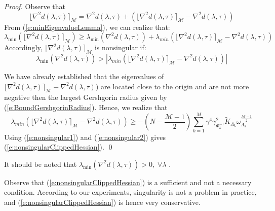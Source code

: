 \begin{proof}
Observe that
\begin{equation}
\lfloor \nabla^2 d(\lambda, \tau) \rceil_{\mathcal{M}} = \nabla^2 d(\lambda, \tau) + \left( \lfloor \nabla^2 d(\lambda, \tau) \rceil_{\mathcal{M}} - \nabla^2 d(\lambda,\tau) \right)
\end{equation}
From (\ref{e:minEigenvalueLemma}), we can realize that:
\begin{equation}
\lambda_{\min} (\lfloor \nabla^2 d(\lambda, \tau) \rceil_{\mathcal{M}}) \geq \lambda_{\min}(\nabla^2 d(\lambda,\tau)) + \lambda_{min} (\lfloor \nabla^2 d(\lambda, \tau) \rceil_{\mathcal{M}} - \nabla^2 d(\lambda,\tau))
\end{equation}
Accordingly, $\lfloor \nabla^2 d(\lambda, \tau) \rceil_{\mathcal{M}}$ is nonsingular if:
\begin{equation} \label{e:nonsingular1}
\lambda_{\min}(\nabla^2 d(\lambda,\tau)) >  | \lambda_{min} (\lfloor \nabla^2 d(\lambda, \tau) \rceil_{\mathcal{M}} - \nabla^2 d(\lambda,\tau)) |
\end{equation}

We have already established that the eigenvalues of $\lfloor \nabla^2 d(\lambda, \tau) \rceil_{\mathcal{M}} - \nabla^2 d(\lambda,\tau))$ are located close to the origin and are not more negative then the largest Gershgorin radius given by (\ref{e:BoundGershgorinRadius}). Hence, we realize that 
\begin{equation} \label{e:nonsingular2}
\lambda_{min} (\lfloor \nabla^2 d(\lambda, \tau) \rceil_{\mathcal{M}} - \nabla^2 d(\lambda,\tau)) \geq -\left( N -\frac{\mathcal{M} - 1}{2} \right) \sum_{k=1}^M \gamma^4 \gamma_{\Phi_k^{-1}}^2 \tilde{K}_{\Lambda_k} \omega_{\Lambda_k}^{\frac{\mathcal{M} - 1}{2}}
\end{equation}
Using (\ref{e:nonsingular1}) and (\ref{e:nonsingular2}) gives (\ref{e:nonsingularClippedHessian}).
\qed
\end{proof}
\begin{remark}
It should be noted that $\lambda_{\min}(\nabla^2 d(\lambda,\tau)) > 0, \; \forall \lambda$ \cite{Klintberg2014}.
\end{remark}
\begin{remark}
Observe that (\ref{e:nonsingularClippedHessian}) is a sufficient and not a necessary condition. According to our experiments, singularity is not a problem in practice, and (\ref{e:nonsingularClippedHessian}) is hence very conservative.
\end{remark}

